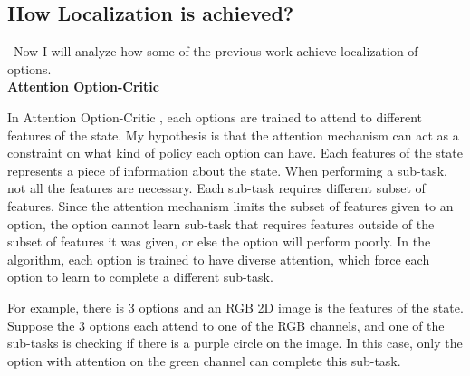 \documentclass{article}
\begin{document}
	\subsection*{How Localization is achieved?}
	\qquad \ Now I will analyze how some of the previous work achieve localization of options.\vspace{0.15in}\\
	\large{\bfseries{Attention Option-Critic}}\vspace{0.05in}
	
	\normalsize{\quad In Attention Option-Critic \cite{attentionoptioncritic}, each options are trained to attend to different features of the state. My hypothesis is that the attention mechanism can act as a constraint on what kind of policy each option can have. Each features of the state represents a piece of information about the state. When performing a sub-task, not all the features are necessary. Each sub-task requires different subset of features. Since the attention mechanism limits the subset of features given to an option, the option cannot learn sub-task that requires features outside of the subset of features it was given, or else the option will perform poorly. In the algorithm, each option is trained to have diverse attention, which force each option to learn to complete a different sub-task.
		
	\quad For example, there is 3 options and an RGB 2D image is the features of the state. Suppose the 3 options each attend to one of the RGB channels, and one of the sub-tasks is checking if there is a purple circle on the image. In this case, only the option with attention on the green channel can complete this sub-task.}
\end{document}
